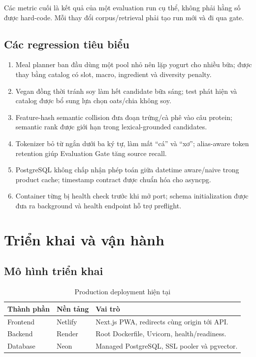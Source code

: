 \documentclass[12pt,a4paper]{report}
\begin{document}
Các metric cuối là kết quả của một evaluation run cụ thể, không phải hằng số
được hard-code. Mỗi thay đổi corpus/retrieval phải tạo run mới và đi qua gate.

\section{Các regression tiêu biểu}

\begin{enumerate}
  \item Meal planner ban đầu dùng một pool nhỏ nên lặp yogurt cho nhiều bữa;
  được thay bằng catalog có slot, macro, ingredient và diversity penalty.
  \item Vegan đồng thời tránh soy làm hết candidate bữa sáng; test phát hiện và
  catalog được bổ sung lựa chọn oats/chia không soy.
  \item Feature-hash semantic collision đưa đoạn trứng/cà phê vào câu protein;
  semantic rank được giới hạn trong lexical-grounded candidates.
  \item Tokenizer bỏ từ ngắn dưới ba ký tự, làm mất ``cá'' và ``xơ''; alias-aware
  token retention giúp Evaluation Gate tăng source recall.
  \item PostgreSQL không chấp nhận phép toán giữa datetime aware/naive trong
  product cache; timestamp contract được chuẩn hóa cho asyncpg.
  \item Container từng bị health check trước khi mở port; schema initialization
  được đưa ra background và health endpoint hỗ trợ preflight.
\end{enumerate}

\chapter{Triển khai và vận hành}

\section{Mô hình triển khai}

\begin{table}[H]
\centering
\begin{tabularx}{\textwidth}{lXX}
\toprule
\textbf{Thành phần} & \textbf{Nền tảng} & \textbf{Vai trò}\\
\midrule
Frontend & Netlify & Next.js PWA, redirects cùng origin tới API.\\
Backend & Render & Root Dockerfile, Uvicorn, health/readiness.\\
Database & Neon & Managed PostgreSQL, SSL pooler và pgvector.\\
\bottomrule
\end{tabularx}
\caption{Production deployment hiện tại}
\end{table}
\end{document}

